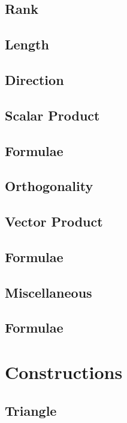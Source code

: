 \documentclass[journal]{IEEEtran}
\begin{document}
\subsection{Rank}

\subsection{Length}

%
\subsection{Direction}

\subsection{Scalar Product}

\subsection{Formulae}

\subsection{Orthogonality}

\subsection{Vector Product}

\subsection{Formulae}

\subsection{Miscellaneous}

\subsection{Formulae}

\newpage
\section{Constructions}
\subsection{Triangle}

\end{document}
